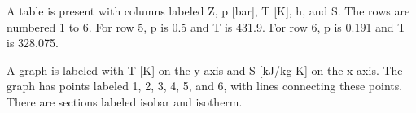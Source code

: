 A table is present with columns labeled Z, p [bar], T [K], h, and S. The rows are numbered 1 to 6. For row 5, p is 0.5 and T is 431.9. For row 6, p is 0.191 and T is 328.075.

A graph is labeled with T [K] on the y-axis and S [kJ/kg K] on the x-axis. The graph has points labeled 1, 2, 3, 4, 5, and 6, with lines connecting these points. There are sections labeled isobar and isotherm.